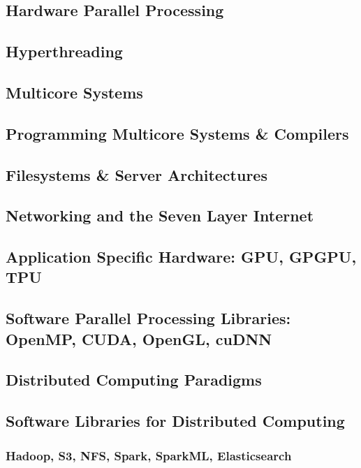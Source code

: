 \subsection{Hardware Parallel Processing}

\subsection{Hyperthreading}

\subsection{Multicore Systems}

\subsection{Programming Multicore Systems \& Compilers}

\subsection{Filesystems \& Server Architectures}

\subsection{Networking and the Seven Layer Internet}

\subsection{Application Specific Hardware: GPU, GPGPU, TPU}

\subsection{Software Parallel Processing Libraries: OpenMP, CUDA, OpenGL, cuDNN}

\subsection{Distributed Computing Paradigms}

\subsection{Software Libraries for Distributed Computing}
  \subsubsection{Hadoop, S3, NFS, Spark, SparkML, Elasticsearch}
